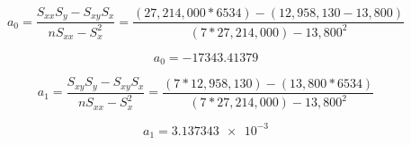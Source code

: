 \documentclass{article}
\begin{document}
        \begin{equation}
            a_0 = \frac{S_{xx}S_y - S_{xy}S_x}{nS_{xx} - S^2_x} = \frac{(27,214,000*6534) - (12,958,130-13,800)}{(7*27,214,000)-13,800^2}
        \end{equation}

        \begin{equation}
            a_0 = -17343.41379
        \end{equation}  

        \begin{equation}
            a_1 = \frac{S_{xy}S_y - S_{xy}S_x}{nS_{xx} - S^2_x} = \frac{(7*12,958,130) - (13,800*6534)}{(7*27,214,000)-13,800^2}
        \end{equation}

        \begin{equation}
            a_1 = \num{3.137343e-3}
        \end{equation}  
        
\end{document}
